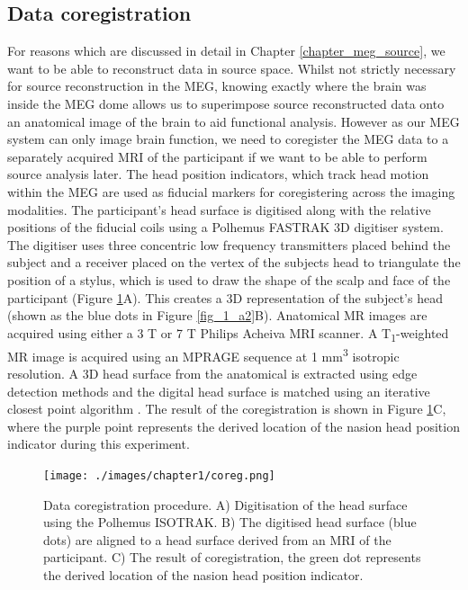 \subsection{Data coregistration}
For reasons which are discussed in detail in Chapter \ref{chapter_meg_source}, we want to be able to reconstruct data in source space. Whilst not strictly necessary for source reconstruction in the MEG, knowing exactly where the brain was inside the MEG dome allows us to superimpose source reconstructed data onto an anatomical image of the brain to aid functional analysis. However as our MEG system can only image brain function, we need to coregister the MEG data to a separately acquired MRI of the participant if we want to be able to perform source analysis later. The head position indicators, which track head motion within the MEG are used as fiducial markers for coregistering across the imaging modalities. The participant's head surface is digitised along with the relative positions of the fiducial coils using a Polhemus FASTRAK 3D digitiser system. The digitiser uses three concentric low frequency transmitters placed behind the subject and a receiver placed on the vertex of the subjects head to triangulate the position of a stylus, which is used to draw the shape of the scalp and face of the participant (Figure \ref{fig_1_a3}A). This creates a 3D representation of the subject's head (shown as the blue dots in Figure \ref{fig_1_a2}B). Anatomical MR images are acquired using either a 3 T or 7 T Philips Acheiva MRI scanner. A T\textsubscript{1}-weighted MR image is acquired using an MPRAGE sequence \citep{BrantZawadzki1992} at 1 mm\textsuperscript{3} isotropic resolution. A 3D head surface from the anatomical is extracted using edge detection methods and the digital head surface is matched using an iterative closest point algorithm \citep{Besl1992}. The result of the coregistration is shown in Figure \ref{fig_1_a3}C, where the purple point represents the derived location of the nasion head position indicator during this experiment. 

\begin{figure}[h!]
	\begin{center}
		\texttt{[image: ./images/chapter1/coreg.png]}\caption{Data coregistration procedure. A) Digitisation of the head surface using the Polhemus ISOTRAK. B) The digitised head surface (blue dots) are aligned to a head surface derived from an MRI of the participant. C) The result of coregistration, the green dot represents the derived location of the nasion head position indicator. }\label{fig_1_a3}
	\end{center}
\end{figure}

